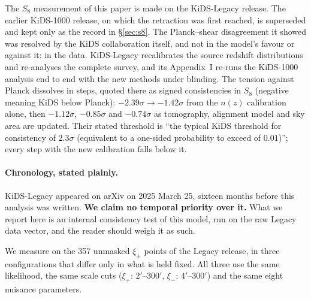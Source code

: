 \documentclass[12pt,a4paper]{article}
\begin{document}
The $S_8$ measurement of this paper is made on the KiDS-Legacy release. The
earlier KiDS-1000 release, on which the retraction was first reached, is
superseded and kept only as the record in \S\ref{sec:s8}. The Planck--shear
disagreement it showed was resolved by the KiDS collaboration itself, and not in
the model's favour or against it: in the data. KiDS-Legacy
\citep{Wright2025} recalibrates the source redshift distributions and re-analyses
the complete survey, and its Appendix~I re-runs the KiDS-1000 analysis end to
end with the new methods under blinding. The tension against Planck dissolves in
steps, quoted there as signed consistencies in $S_8$ (negative meaning KiDS
below Planck): $-2.39\sigma \to -1.42\sigma$ from the $n(z)$ calibration
alone, then $-1.12\sigma$, $-0.85\sigma$ and $-0.74\sigma$ as tomography,
alignment model and sky area are updated. Their stated threshold is
``the typical KiDS threshold for consistency of $2.3\sigma$ (equivalent to a
one-sided probability to exceed of $0.01$)''; every step with the new
calibration falls below it.

\paragraph{Chronology, stated plainly.} KiDS-Legacy appeared on arXiv on
2025 March 25, sixteen months before this analysis was written.
\textbf{We claim no temporal priority over it.} What we report here is an
internal consistency test of this model, run on the raw Legacy data vector, and
the reader should weigh it as such.

We measure on the 357 unmasked $\xi_\pm$ points
of the Legacy release, in three configurations that differ only in what is held
fixed. All three use the same likelihood, the same scale cuts
($\xi_+$: $2'$--$300'$, $\xi_-$: $4'$--$300'$) and the same eight nuisance
parameters.
\end{document}
